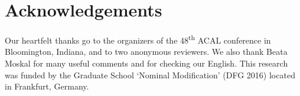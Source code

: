 \documentclass[output=paper]{langscibook}
\begin{document}
\section{Acknowledgements}
\label{sec:traore:acknowledgements:6a}
Our heartfelt thanks go to the organizers of the 48\textsuperscript{th} ACAL conference in Bloomington, Indiana, and to two anonymous reviewers. We also thank Beata Moskal for many useful comments and for checking our English. This research was funded by the Graduate School ‘Nominal Modification’ (DFG 2016) located in Frankfurt, Germany.
\nocite{TraoreUnp}
\nocite{Traore2018}
{\sloppy
\printbibliography[heading=subbibliography,notkeyword=this] 
}
\end{document}

